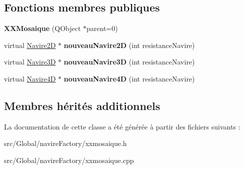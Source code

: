 \subsection*{Fonctions membres publiques}
\begin{DoxyCompactItemize}
\item 
{\bfseries X\+X\+Mosaique} (Q\+Object $\ast$parent=0)\hypertarget{class_x_x_mosaique_af43bf5beedd8ac7142b958db60d2df5d}{}\label{class_x_x_mosaique_af43bf5beedd8ac7142b958db60d2df5d}

\item 
virtual \hyperlink{class_navire2_d}{Navire2D} $\ast$ {\bfseries nouveau\+Navire2D} (int resistance\+Navire)\hypertarget{class_x_x_mosaique_a85c1930e95395ce065cd231a8f76a1e5}{}\label{class_x_x_mosaique_a85c1930e95395ce065cd231a8f76a1e5}

\item 
virtual \hyperlink{class_navire3_d}{Navire3D} $\ast$ {\bfseries nouveau\+Navire3D} (int resistance\+Navire)\hypertarget{class_x_x_mosaique_a56bad629704b0a47afc857153006b53d}{}\label{class_x_x_mosaique_a56bad629704b0a47afc857153006b53d}

\item 
virtual \hyperlink{class_navire4_d}{Navire4D} $\ast$ {\bfseries nouveau\+Navire4D} (int resistance\+Navire)\hypertarget{class_x_x_mosaique_a91c3b7071b0206185750cacda70d736b}{}\label{class_x_x_mosaique_a91c3b7071b0206185750cacda70d736b}

\end{DoxyCompactItemize}
\subsection*{Membres hérités additionnels}


La documentation de cette classe a été générée à partir des fichiers suivants \+:\begin{DoxyCompactItemize}
\item 
src/\+Global/navire\+Factory/xxmosaique.\+h\item 
src/\+Global/navire\+Factory/xxmosaique.\+cpp\end{DoxyCompactItemize}
